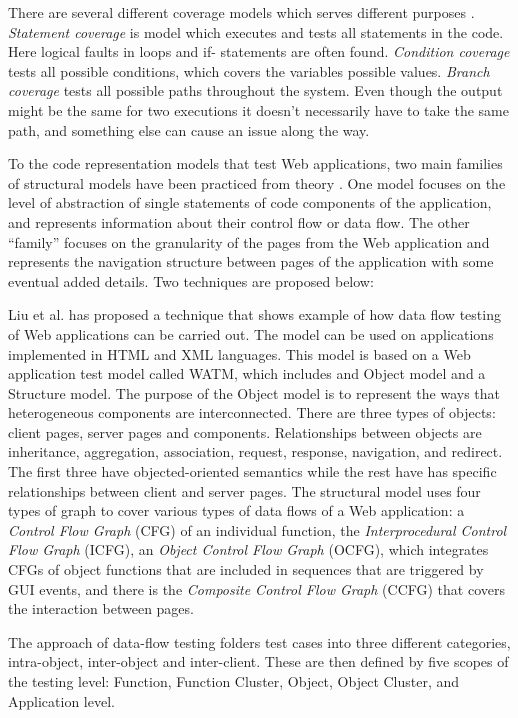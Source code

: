 \documentclass[a4paper]{article}
\begin{document}
There are several different coverage models which serves different purposes \cite{ib03}. \emph{Statement coverage}
is model which executes and tests all statements in the code. Here logical faults in loops and if-
statements are often found. \emph{Condition coverage} tests all possible conditions, which covers the
variables possible values. \emph{Branch coverage} tests all possible paths throughout the system. Even
though the output might be the same for two executions it doesn’t necessarily have to take the same
path, and something else can cause an issue along the way.

To the code representation models that test Web applications, two main families of structural
models have been practiced from theory \cite{dlf06}. One model focuses on the level of abstraction of
single statements of code components of the application, and represents information about their
control flow or data flow. The other “family” focuses on the granularity of the pages from the Web
application and represents the navigation structure between pages of the application with some
eventual added details. Two techniques are proposed below:

Liu et al.\cite{lkhh01} has proposed a technique that shows example of how data flow testing of Web
applications can be carried out. The model can be used on applications implemented in HTML and
XML languages. This model is based on a Web application test model called WATM, which includes
and Object model and a Structure model. The purpose of the Object model is to represent the
ways that heterogeneous components are interconnected. There are three types of objects: client
pages, server pages and components. Relationships between objects are inheritance, aggregation,
association, request, response, navigation, and redirect. The first three have objected-oriented
semantics while the rest have has specific relationships between client and server pages. The
structural model uses four types of graph to cover various types of data flows of a Web application:
a \emph{Control Flow Graph} (CFG) of an individual function, the \emph{Interprocedural Control Flow Graph} (ICFG),
an \emph{Object Control Flow Graph} (OCFG), which integrates CFGs of object functions that are included in
sequences that are triggered by GUI events, and there is the \emph{Composite Control Flow Graph} (CCFG)
that covers the interaction between pages.

The approach of data-flow testing folders test cases into three different categories, intra-object,
inter-object and inter-client. These are then defined by five scopes of the testing level: Function,
Function Cluster, Object, Object Cluster, and Application level.
\end{document}
